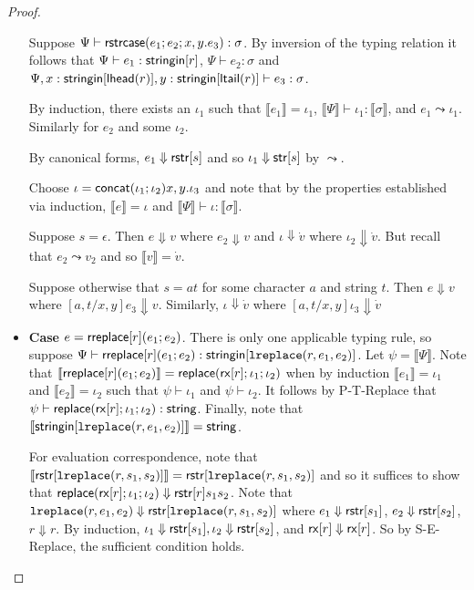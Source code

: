 \documentclass[11pt,leqno]{article}
\theoremstyle{definition}
\newcommand{\stringin}[1]{{\sf stringin}[#1]}
\renewcommand{\tstr}[1]{{{\sf str}[#1]}}
\newcommand{\treplace}[3]{{\sf replace}(#1;#2;#3)}
\newcommand{\tconcat}[2]{{\sf concat}(#1;#2)} \newcommand{\concat}[2]{{\sf concat}(#1;#2)} %
\newcommand{\rx}[1]{ {\sf rx}[#1] }
\newcommand{\str}{{\sf string}}
\newcommand{\lreplace}[3]{{\sf lreplace}(#1; #2; #3)}
\newcommand{\sctx}{\Psi} %
\newcommand{\strcase}[3]{ {\sf rstrcase}(#1; #2; #3)}
\newcommand{\lhead}[1]{ {\sf lhead}(#1) }
\newcommand{\ltail}[1]{ {\sf ltail}(#1) }
\newcommand{\trden}[1]{\llbracket #1 \rrbracket} %
\newcommand{\treduces}{ \Downarrow }
\newcommand{\sreduces}{ \Downarrow }
\renewcommand{\lreplace}[3]{{\tt lreplace}(#1, #2, #3)}
\begin{document}
\begin{proof}
\begin{itemize}[label=$ $, itemsep=1ex]
Suppose $\sctx \vdash \strcase{e_1}{e_2}{x,y.e_3} : \sigma$.
By inversion of the typing relation it follows that
$\sctx \vdash e_1 : \stringin{r}$, $\sctx \vdash e_2 : \sigma$ and $\sctx, x : \stringin{\lhead{r}}, y : \stringin{\ltail{r}} \vdash e_3 : \sigma$.

By induction, there exists an $\iota_1$ such that $\trden{e_1} = \iota_1$,
$\trden{\sctx} \vdash \iota_1 : \trden{\sigma}$, and $e_1 \leadsto \iota_1$.
Similarly for $e_2$ and some $\iota_2$.

By canonical forms, $e_1 \sreduces \rstr{s}$ and so $\iota_1 \treduces \tstr{s}$ by $\leadsto$.

Choose $\iota = \tconcat{\iota_1}{\iota_2}{x,y.\iota_3}$ and note that by the properties established via induction,
$\trden{e} = \iota$ and $\trden{\sctx} \vdash \iota : \trden{\sigma}$.

Suppose $s = \epsilon$. Then $e \sreduces v$ where $e_2 \sreduces v$
and $\iota \treduces \dot{v}$ where $\iota_2 \treduces \dot{v}$.
But recall that $e_2 \leadsto v_2$ and so $\trden{v} = \dot{v}$.

Suppose otherwise that $s = at$ for some character $a$ and string $t$.
Then $e \sreduces v$ where $[a, t / x, y] e_3 \sreduces v$.
Similarly, $\iota \treduces \dot{v}$ where $[a, t / x, y] \iota_3 \treduces \dot{v}$

\item \textbf{Case $e = {\sf rreplace}[r](e_1;e_2)$}.
There is only one applicable typing rule, so suppose
$\sctx \vdash \rreplace{r}{e_1}{e_2} : \stringin{\lreplace{r}{e_1}{e_2}}$.
Let $\psi = \trden{\sctx}$.
Note that $\trden{\rreplace{r}{e_1}{e_2}} = \treplace{\rx{r}}{\iota_1}{\iota_2}$
when by induction $\trden{e_1} = \iota_1$ and $\trden{e_2} = \iota_2$
such that $\psi \vdash \iota_1$ and $\psi \vdash \iota_2$.
It follows by P-T-Replace that $\psi \vdash \treplace{\rx{r}}{\iota_1}{\iota_2} : \str$.
Finally, note that $\trden{\stringin{\lreplace{r}{e_1}{e_2}}} = \str$.

For evaluation correspondence, note that $\trden{ \rstr{\lreplace{r}{s_1}{s_2}} } = \rstr{ \lreplace{r}{s_1}{s_2} }$ and
so it suffices to show that $\treplace{\rx{r}}{\iota_1}{\iota_2} \sreduces \rstr{r}{s_1}{s_2}$.
Note that $\lreplace{r}{e_1}{e_2} \sreduces \rstr{\lreplace{r}{s_1}{s_2}}$ 
where $e_1 \sreduces \rstr{s_1}$, $e_2 \sreduces \rstr{s_2}$, $r \sreduces r$.
By induction, $\iota_1 \sreduces \rstr{s_1}, \iota_2 \sreduces \rstr{s_2}$, and $\rx{r} \sreduces \rx{r}$.
So by S-E-Replace, the sufficient condition holds.


\end{itemize}
\end{proof}
\end{document}

